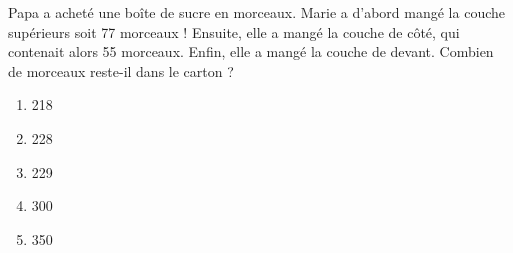 Papa a acheté une boîte de sucre en morceaux. Marie a d'abord mangé la couche supérieurs soit 77 morceaux ! Ensuite, elle a mangé la couche de côté, qui contenait alors 55 morceaux. Enfin, elle a mangé la couche de devant. Combien de morceaux reste-il dans le carton ?
\begin{multicols}{5}
  \begin{enumerate}[A/]
  \item 218
  \item 228
  \item 229
  \item 300
  \item 350
  \end{enumerate}
\end{multicols}